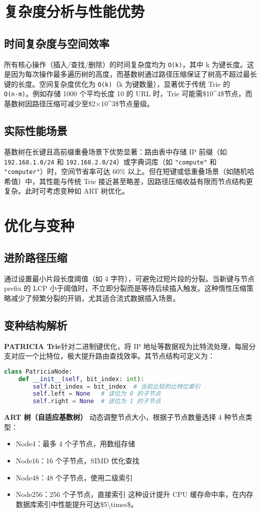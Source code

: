 \chapter{复杂度分析与性能优势}
\section{时间复杂度与空间效率}
所有核心操作（插入/查找/删除）的时间复杂度均为 \texttt{O(k)}，其中 k 为键长度。这是因为每次操作最多遍历树的高度，而基数树通过路径压缩保证了树高不超过最长键的长度。空间复杂度优化为 \texttt{O(k)}（k 为键数量），显著优于传统 Trie 的 \texttt{O(n·m)}。例如存储 1000 个平均长度 10 的 URL 时，Trie 可能需\${}10\^{}4\${}节点，而基数树因路径压缩可减少至\${}2×10\^{}3\${}节点量级。\par
\section{实际性能场景}
基数树在长键且高前缀重叠场景下优势显著：路由表中存储 IP 前缀（如 \texttt{192.168.1.0/24} 和 \texttt{192.168.2.0/24}）或字典词库（如 \texttt{"compute"} 和 \texttt{"computer"}）时，空间节省率可达 60\%{} 以上。但在短键或低重叠场景（如随机哈希值）中，其性能与传统 Trie 接近甚至略差，因路径压缩收益有限而节点结构更复杂。此时可考虑变种如 ART 树优化。\par
\chapter{优化与变种}
\section{进阶路径压缩}
通过设置最小片段长度阈值（如 4 字符），可避免过短片段的分裂。当新键与节点 prefix 的 LCP 小于阈值时，不立即分裂而是等待后续插入触发。这种惰性压缩策略减少了频繁分裂的开销，尤其适合流式数据插入场景。\par
\section{变种结构解析}
\textbf{PATRICIA Trie}针对二进制键优化，将 IP 地址等数据视为比特流处理，每层分支对应一个比特位，极大提升路由查找效率。其节点结构可定义为：\par
\begin{lstlisting}[language=python]
class PatriciaNode:
    def __init__(self, bit_index: int):
        self.bit_index = bit_index  # 当前比较的比特位索引
        self.left = None   # 该位为 0 的子节点
        self.right = None  # 该位为 1 的子节点
\end{lstlisting}
\textbf{ART 树（自适应基数树）} 动态调整节点大小，根据子节点数量选择 4 种节点类型：\par
\begin{itemize}
\item Node4：最多 4 个子节点，用数组存储
\item Node16：16 个子节点，SIMD 优化查找
\item Node48：48 个子节点，使用二级索引
\item Node256：256 个子节点，直接索引
这种设计提升 CPU 缓存命中率，在内存数据库索引中性能提升可达\${}5\textbackslash{}times\${}。
\end{itemize}
